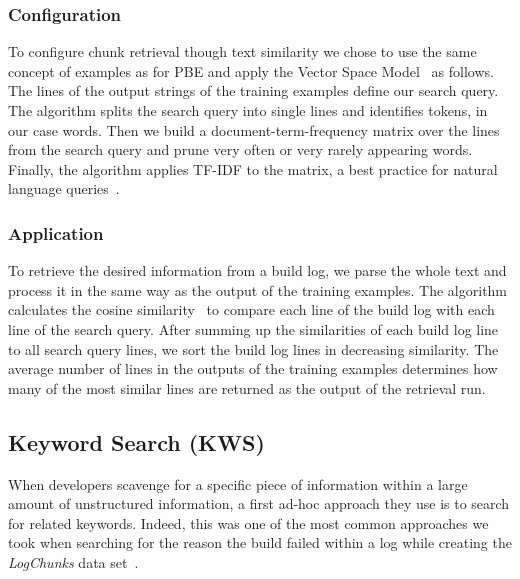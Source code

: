\subsubsection{Configuration}
To configure chunk retrieval though text similarity we chose to use
the same concept of examples as for PBE
and apply the Vector Space Model~\cite{schutze2008introduction}
as follows.
The
lines of the output strings of the training examples define our search
query.
The algorithm splits the search query into single lines and
identifies tokens, in our case words.
Then we build a
document-term-frequency matrix over the lines from the search query
and prune very often or very rarely appearing words.
Finally, the
algorithm applies TF-IDF to the matrix, a best practice for natural
language queries~\cite{lee1997document}.

\subsubsection{Application}
To retrieve the desired information from a build log, we parse the
whole text and process it in the same way as the output of the
training examples.
The algorithm calculates the cosine
similarity~\cite{korenius2007principal} to compare each line of the
build log with each line of the search query.
After summing up the
similarities of each build log line to all search query lines, we sort
the build log lines in decreasing similarity.
The average number of
lines in the outputs of the training examples determines how many of
the most similar lines are returned as the output of the retrieval
run.

\subsection{Keyword Search (KWS)}
\label{sec:expl-skws}
When developers scavenge for a specific piece of information within a
large amount of unstructured information, a first ad-hoc approach they
use is to search for related keywords.
Indeed, this was one of the
most common approaches we took when searching for the reason the build
failed within a log while creating the \emph{LogChunks} data
set~\cite{brandt2020logchunks}.

